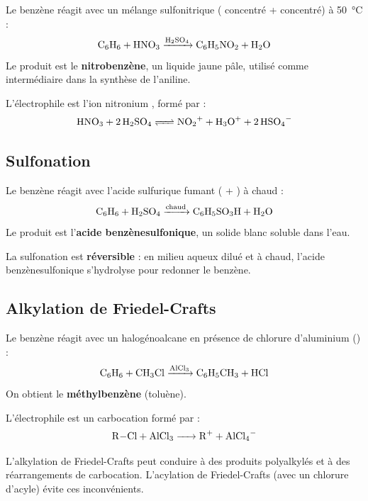 \begin{experience}
Le benzène réagit avec un mélange sulfonitrique ( concentré +  concentré) à \SI{50}{\celsius} :
\[\ce{C6H6 + HNO3 ->[H2SO4] C6H5NO2 + H2O}\]
Le produit est le \textbf{nitrobenzène}, un liquide jaune pâle, utilisé comme intermédiaire dans la synthèse de l'aniline.
\end{experience}

L'électrophile est l'ion nitronium , formé par :
\[\ce{HNO3 + 2 H2SO4 <=> NO2+ + H3O+ + 2 HSO4-}\]

\subsection{Sulfonation}

\begin{experience}
Le benzène réagit avec l'acide sulfurique fumant ( + ) à chaud :
\[\ce{C6H6 + H2SO4 ->[chaud] C6H5SO3H + H2O}\]
Le produit est l'\textbf{acide benzènesulfonique}, un solide blanc soluble dans l'eau.
\end{experience}

\begin{remarque}
La sulfonation est \textbf{réversible} : en milieu aqueux dilué et à chaud, l'acide benzènesulfonique s'hydrolyse pour redonner le benzène.
\end{remarque}

\subsection{Alkylation de Friedel-Crafts}

\begin{experience}
Le benzène réagit avec un halogénoalcane en présence de chlorure d'aluminium () :
\[\ce{C6H6 + CH3Cl ->[AlCl3] C6H5CH3 + HCl}\]
On obtient le \textbf{méthylbenzène} (toluène).
\end{experience}

L'électrophile est un carbocation  formé par :
\[\ce{R-Cl + AlCl3 -> R+ + AlCl4-}\]

\begin{remarque}
L'alkylation de Friedel-Crafts peut conduire à des produits polyalkylés et à des réarrangements de carbocation. L'acylation de Friedel-Crafts (avec un chlorure d'acyle) évite ces inconvénients.
\end{remarque}

